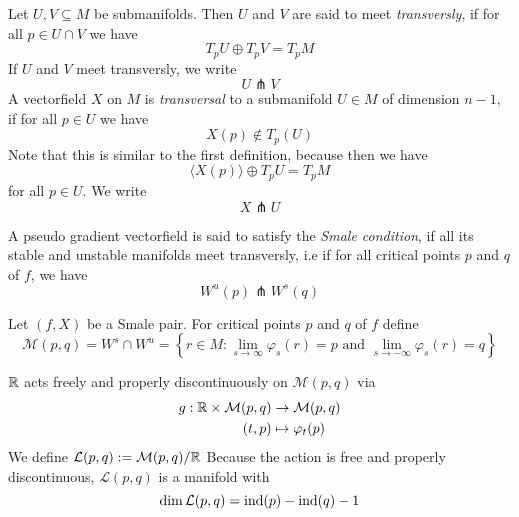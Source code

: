 \begin{definition}[Transversality]
    Let $U, V \subseteq M$ be submanifolds. Then $U$ and $V$ are said to meet 
    \textit{transversly}, if for all $p \in U \cap V$ we have
    \[ T_pU \oplus T_pV = T_pM \]
    If $U$ and $V$ meet transversly, we write
    \[ U \pitchfork V \]
    A vectorfield $X$ on $M$ is \textit{transversal} to a submanifold $U \in M$ of dimension
    $n - 1$, if for all $p \in U$ we have 
    \[ X(p) \notin T_p(U) \]
    Note that this is similar to the first definition, because then we have
    \[ \langle X(p) \rangle \oplus T_pU = T_pM \]
    for all $p \in U$.
    We write 
    \[ X \pitchfork U \]
\end{definition}

\begin{definition}
    A pseudo gradient vectorfield is said to satisfy the \textit{Smale condition}, if
    all its stable and unstable manifolds meet transversly, i.e if for all critical points
    $p$ and $q$ of $f$, we have
    \[ W^u(p) \pitchfork W^s(q) \]
\end{definition}

\begin{prop}
    Let $(f, X)$ be a Smale pair. For critical points $p$ and $q$ of $f$ define
    \[ \mathcal{M}(p, q) = W^s \cap W^u = 
    \left\{ r \in M : \lim_{s \to \infty} \varphi_s(r) = p \text{ and } 
    \lim_{s \to -\infty} \varphi_s(r) = q \right\} \]
\end{prop}

\begin{prop}
    ${ \mathbb R }$ acts freely and properly discontinuously on $\mathcal{M}(p, q)$ 
    via 
    \begin{align*}
        g: { \mathbb R } \times \mathcal{M}(p, q) & \to \mathcal{M}(p, q) \\
        (t, p) & \mapsto \varphi_t(p)
    \end{align*}
    We define $\mathcal{L}(p, q) := \mathcal{M}(p, q)/{ \mathbb R }$
    Because the action is free and properly discontinuous, $\mathcal{L}(p, q)$ is 
    a manifold with 
    \[ \dim \mathcal{L}(p, q)  = { \operatorname{ind} } (p) - { \operatorname{ind} } (q) - 1 \]
\end{prop}
